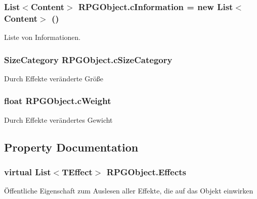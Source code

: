 \subsubsection[{c\+Information}]{\setlength{\rightskip}{0pt plus 5cm}List$<${\bf Content}$>$ R\+P\+G\+Object.\+c\+Information = new List$<${\bf Content}$>$ ()\hspace{0.3cm}{\ttfamily [protected]}}\label{class_r_p_g_object_ac5b133eca19e8f97988722018cdf139b}
Liste von Informationen. \hypertarget{class_r_p_g_object_a5076aeba98770e8507778eb6051df87b}{}
\subsubsection[{c\+Size\+Category}]{\setlength{\rightskip}{0pt plus 5cm}Size\+Category R\+P\+G\+Object.\+c\+Size\+Category\hspace{0.3cm}{\ttfamily [protected]}}\label{class_r_p_g_object_a5076aeba98770e8507778eb6051df87b}
Durch Effekte veränderte Größe \hypertarget{class_r_p_g_object_a098dcfa4772557888348f5164da509f8}{}
\subsubsection[{c\+Weight}]{\setlength{\rightskip}{0pt plus 5cm}float R\+P\+G\+Object.\+c\+Weight\hspace{0.3cm}{\ttfamily [protected]}}\label{class_r_p_g_object_a098dcfa4772557888348f5164da509f8}
Durch Effekte verändertes Gewicht 

\subsection{Property Documentation}
\hypertarget{class_r_p_g_object_ac13bdb9e5988e9eff18e5f6f5b613bb6}{}
\subsubsection[{Effects}]{\setlength{\rightskip}{0pt plus 5cm}virtual List$<${\bf T\+Effect}$>$ R\+P\+G\+Object.\+Effects\hspace{0.3cm}{\ttfamily [get]}}\label{class_r_p_g_object_ac13bdb9e5988e9eff18e5f6f5b613bb6}
Öffentliche Eigenschaft zum Auslesen aller Effekte, die auf das Objekt einwirken \hypertarget{class_r_p_g_object_a312d68adaf6a8eb15319d3cac8198802}{}
